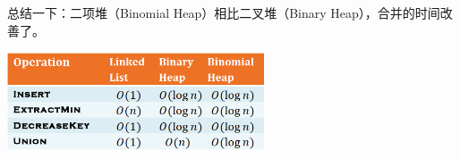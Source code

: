    总结一下：二项堆（Binomial Heap）相比二叉堆（Binary Heap），合并的时间改善了。
   \begin{center}
   	\includegraphics[width=3in]{L7-heaptablebinomialheap.png} 
   \end{center}
  	
  	
  
  	
  